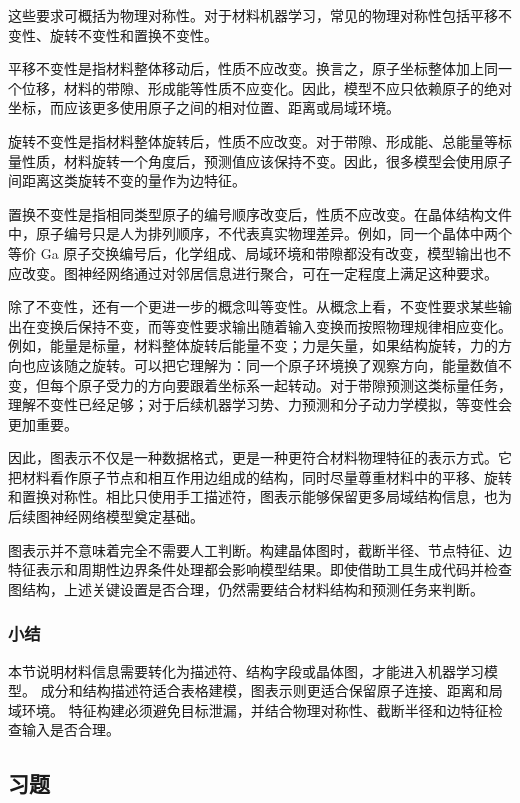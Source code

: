 这些要求可概括为物理对称性。对于材料机器学习，常见的物理对称性包括平移不变性、旋转不变性和置换不变性。


平移不变性是指材料整体移动后，性质不应改变。换言之，原子坐标整体加上同一个位移，材料的带隙、形成能等性质不应变化。因此，模型不应只依赖原子的绝对坐标，而应该更多使用原子之间的相对位置、距离或局域环境。


旋转不变性是指材料整体旋转后，性质不应改变。对于带隙、形成能、总能量等标量性质，材料旋转一个角度后，预测值应该保持不变。因此，很多模型会使用原子间距离这类旋转不变的量作为边特征。


置换不变性是指相同类型原子的编号顺序改变后，性质不应改变。在晶体结构文件中，原子编号只是人为排列顺序，不代表真实物理差异。例如，同一个晶体中两个等价 Ga 原子交换编号后，化学组成、局域环境和带隙都没有改变，模型输出也不应改变。图神经网络通过对邻居信息进行聚合，可在一定程度上满足这种要求。


除了不变性，还有一个更进一步的概念叫等变性。从概念上看，不变性要求某些输出在变换后保持不变，而等变性要求输出随着输入变换而按照物理规律相应变化。例如，能量是标量，材料整体旋转后能量不变；力是矢量，如果结构旋转，力的方向也应该随之旋转。可以把它理解为：同一个原子环境换了观察方向，能量数值不变，但每个原子受力的方向要跟着坐标系一起转动。对于带隙预测这类标量任务，理解不变性已经足够；对于后续机器学习势、力预测和分子动力学模拟，等变性会更加重要。


因此，图表示不仅是一种数据格式，更是一种更符合材料物理特征的表示方式。它把材料看作原子节点和相互作用边组成的结构，同时尽量尊重材料中的平移、旋转和置换对称性。相比只使用手工描述符，图表示能够保留更多局域结构信息，也为后续图神经网络模型奠定基础。


图表示并不意味着完全不需要人工判断。构建晶体图时，截断半径、节点特征、边特征表示和周期性边界条件处理都会影响模型结果。即使借助工具生成代码并检查图结构，上述关键设置是否合理，仍然需要结合材料结构和预测任务来判断。

\subsubsection*{\textbf{小结}}

本节说明材料信息需要转化为描述符、结构字段或晶体图，才能进入机器学习模型。
成分和结构描述符适合表格建模，图表示则更适合保留原子连接、距离和局域环境。
特征构建必须避免目标泄漏，并结合物理对称性、截断半径和边特征检查输入是否合理。

\subsection*{习题}


